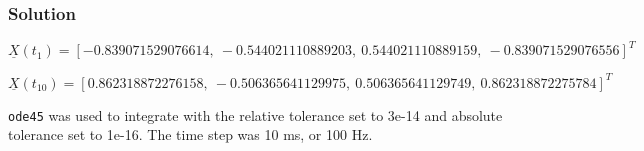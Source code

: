 \documentclass[conf]{new-aiaa}
\begin{document}
\begin{center}
	 \\
\end{center}


\subsubsection*{Solution} 

\begin{equation}
	\underline{X}(t_1) = [         -0.839071529076614,~        -0.544021110889203,~         0.544021110889159,~        -0.839071529076556 ]^T
\end{equation}

\begin{equation}
	\underline{X}(t_{10}) = [ 0.862318872276158,~        -0.506365641129975,~         0.506365641129749,~         0.862318872275784 ]^T
\end{equation}


\texttt{ode45} was used to integrate with the relative tolerance set to 3e-14 and absolute tolerance set to 1e-16. The time step was 10 ms, or 100 Hz. 


%
%


\newpage
\end{document}
